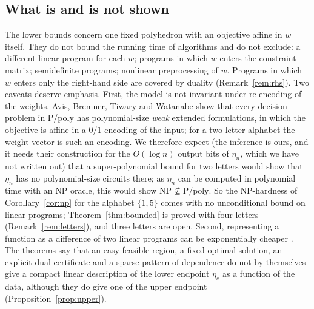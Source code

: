 \documentclass[11pt]{amsart}
\theoremstyle{plain}
\theoremstyle{definition}
\theoremstyle{remark}
\begin{document}
\subsection*{What is and is not shown}
The lower bounds concern one fixed polyhedron with an objective affine in $w$ itself. They do not bound the running
time of algorithms and do not exclude: a different linear program for each $w$; programs in which $w$ enters the
constraint matrix; semidefinite programs; nonlinear preprocessing of $w$. Programs in which $w$ enters only the
right-hand side are covered by duality (Remark~\ref{rem:rhs}). Two caveats deserve emphasis. First, the model is
not invariant under re-encoding of the weights. Avis, Bremner, Tiwary and Watanabe \cite{ABTW} show that every
decision problem in P/poly has polynomial-size \emph{weak} extended formulations, in which the objective is affine
in a $0/1$ encoding of the input; for a two-letter alphabet the weight vector is such an encoding. We therefore
expect (the inference is ours, and it needs their construction for the $O(\log n)$ output bits of $\eta_n$, which we
have not written out) that a super-polynomial bound for two letters would show that $\eta_n$ has no polynomial-size
circuits there; as $\eta_n$ can be computed in polynomial time with an NP oracle, this would show
$\mathrm{NP}\not\subseteq\mathrm{P/poly}$. So the NP-hardness of Corollary~\ref{cor:np} for the alphabet $\{1,5\}$ comes with no unconditional bound
on linear programs; Theorem~\ref{thm:bounded} is proved with four letters (Remark~\ref{rem:letters}), and three letters are
open. Second, representing a function as a difference of two linear programs can be exponentially cheaper
\cite{BHKL}. The
theorems say that an easy feasible region, a fixed optimal solution, an explicit dual certificate and a sparse
pattern of dependence do not by themselves give a compact linear description of the lower endpoint $\eta_e$ as a
function of the data, although they do give one of the upper endpoint (Proposition~\ref{prop:upper}).
\end{document}
